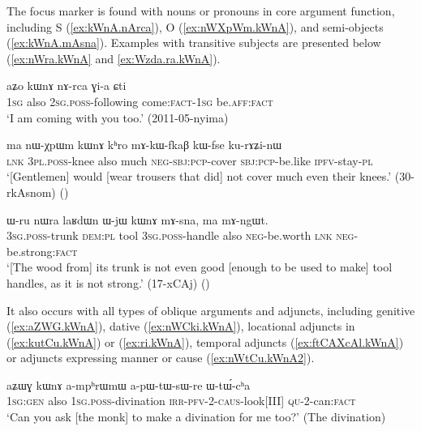 The focus marker  is found with nouns or pronouns in core argument function, including S (\ref{ex:kWnA.nArca}), O (\ref{ex:nWXpWm.kWnA}), and semi-objects (\ref{ex:kWnA.mAsna}).  Examples with transitive subjects are presented below (\ref{ex:nWra.kWnA} and \ref{ex:Wzda.ra.kWnA}).

 \begin{exe}
\ex \label{ex:kWnA.nArca}
\gll aʑo kɯnɤ nɤ-rca ɣi-a ɕti  \\
\textsc{1sg} also \textsc{2sg}.\textsc{poss}-following come:\textsc{fact}-\textsc{1sg} be.\textsc{aff}:\textsc{fact} \\
\glt `I am coming with you too.' (2011-05-nyima)
 \end{exe}
 
   \begin{exe}
\ex \label{ex:nWXpWm.kWnA}
\gll    ma nɯ-χpɯm kɯnɤ kʰro mɤ-kɯ-fkaβ kɯ-fse ku-rɤʑi-nɯ  \\
\textsc{lnk} \textsc{3pl}.\textsc{poss}-knee also much \textsc{neg}-\textsc{sbj}:\textsc{pcp}-cover \textsc{sbj}:\textsc{pcp}-be.like \textsc{ipfv}-stay-\textsc{pl} \\
\glt `[Gentlemen] would [wear trousers that did] not cover much even their knees.'  (30-rkAsnom) 
()
  \end{exe}
  
  \begin{exe}
 \ex \label{ex:kWnA.mAsna}
 \gll   ɯ-ru nɯra laʁdɯn ɯ-jɯ kɯnɤ mɤ-sna, ma mɤ-ngɯt. \\
 \textsc{3sg}.\textsc{poss}-trunk \textsc{dem}:\textsc{pl} tool \textsc{3sg}.\textsc{poss}-handle also \textsc{neg}-be.worth \textsc{lnk}  \textsc{neg}-be.strong:\textsc{fact} \\
 \glt `[The wood from] its trunk is not even good [enough to be used to make] tool handles, as it is not strong.'  (17-xCAj)
()
  \end{exe}

It also occurs with all types of oblique arguments and adjuncts, including genitive  (\ref{ex:aZWG.kWnA}), dative  (\ref{ex:nWCki.kWnA}),  locational adjuncts in  (\ref{ex:kutCu.kWnA}) or  (\ref{ex:ri.kWnA}), temporal adjuncts (\ref{ex:ftCAXcAl.kWnA}) or adjuncts expressing manner or cause (\ref{ex:nWtCu.kWnA2}).  
  
   \begin{exe}
\ex \label{ex:aZWG.kWnA}
\gll aʑɯɣ kɯnɤ a-mpʰrɯmɯ a-pɯ-tɯ-sɯ-re ɯ-tɯ́-cʰa \\
\textsc{1sg}:\textsc{gen} also \textsc{1sg}.\textsc{poss}-divination \textsc{irr}-\textsc{pfv}-2-\textsc{caus}-look[III] \textsc{qu}-2-can:\textsc{fact} \\
\glt `Can you ask [the monk] to make a divination for me too?' (The divination)
\end{exe}  
  
